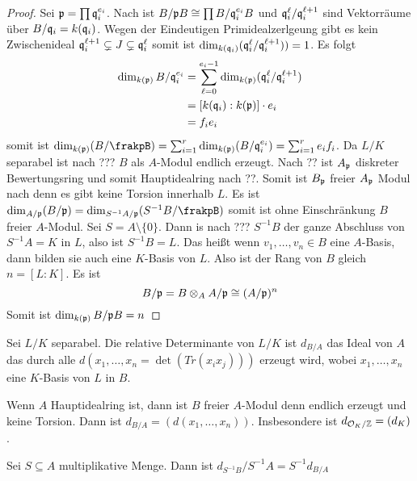 \begin{proof}
	Sei \(\mathfrak{p}=\prod \mathfrak{q}_i^{e_i}\). Nach  ist 
	\(B/\mathfrak{p} B\cong\prod B/\mathfrak{q}_i^{e_i}B\) und 
	\(\mathfrak{q}_i^\ell/\mathfrak{q}_i^{\ell+1}\) sind Vektorräume über \(B/\mathfrak{q}_i=k(\mathfrak{q}_i)\).
	Wegen der Eindeutigen Primidealzerlgeung gibt es kein Zwischenideal \(\mathfrak{q}_i^{\ell+1}\subsetneq J\subsetneq \mathfrak{q}_i^{\ell}\) somit ist
	\(\dim_{k(\mathfrak{q}_i)}(\mathfrak{q}_i^\ell/\mathfrak{q}_i^{\ell+1}))=1\).
	Es folgt
	\begin{align*}
		\dim_{k(\mathfrak{p})}B/\mathfrak{q}_i^{e_i}&= \sum_{\ell=0}^{e_i-1}\dim_{k(\mathfrak{p})}(\mathfrak{q}_i^{\ell}/\mathfrak{q}_i^{\ell+1})\\
		&=[k(\mathfrak{q}_i):k(\mathfrak{p})]\cdot e_i\\
		&= f_ie_i
		\end{align*}
	somit ist \(\dim_{k(\frakp)}(B/\frakpB)=\sum_{i=1}^r\dim_{k(\frakp)}(B/\frakq_i^{e_i})=\sum_{i=1}^re_if_i\).
	Da \(L/K\) separabel ist nach ??? \(B\) als \(A\)-Modul endlich erzeugt.
	Nach ?? ist \(A_{\mathfrak{p}}\) diskreter Bewertungsring und somit Hauptidealring nach ??. Somit ist \(B_{\mathfrak{p}}\) freier \(A_{\mathfrak{p}}\) Modul nach  denn es gibt keine Torsion innerhalb \(L\).
	Es ist \(\dim_{A/\frakp}(B/\frakp)=\dim_{S^{-1} A/\frakp}(S^{-1}B/\frakpB)\) somit ist ohne Einschränkung \(B\) freier \(A\)-Modul. Sei \(S=A\setminus\{0\}\).
	Dann is nach ??? \(S^{-1}B\) der ganze Abschluss von \(S^{-1}A=K\) in \(L\), also ist \(S^{-1}B=L\).
	Das heißt wenn \(v_1,\dots,v_n\in B\) eine \(A\)-Basis, dann bilden sie auch eine \(K\)-Basis von \(L\).
	Also ist der Rang von \(B\) gleich \(n=[L:K]\).
	Es ist \[B/\mathfrak{p}=B\otimes_AA/\mathfrak{p}\cong (A/\mathfrak{p})^n\]
	Somit ist \(\dim_{k(\mathfrak{p})}B/\mathfrak{p} B=n\)
	
\end{proof}
\begin{Def}
	 Sei \(L/K\) separabel. Die relative Determinante von \(L/K\) ist 
	 \(d_{B/A}\) das Ideal von \(A\) das durch alle \(d(x_1,\dots,x_n=\det(Tr(x_ix_j)))\) erzeugt wird, wobei \(x_1,\dots,x_n\) eine \(K\)-Basis von \(L\) in \(B\).
\end{Def}
\begin{Def}
	Wenn \(A\) Hauptidealring ist, dann ist \(B\) freier \(A\)-Modul denn endlich erzeugt und keine Torsion.
	Dann ist \(d_{B/A}=(d(x_1,\dots,x_n))\).
	Insbesondere ist \(d_{\mathcal{O}_K/\mathbb{Z}}=(d_K)\).
\end{Def}
\begin{Bem}
	Sei \(S\subseteq A\) multiplikative Menge. Dann ist
	\(d_{S^{-1}B}/S^{-1}A=S^{-1}d_{B/A}\)
\end{Bem}
